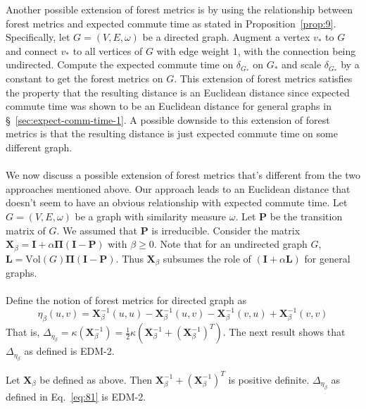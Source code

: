 Another possible extension of forest metrics is by using the
relationship between forest metrics and expected commute time as
stated in Proposition~\ref{prop:9}. Specifically, let $G =
(V,E,\omega)$ be a directed graph. Augment a vertex $v_{*}$ to $G$ and
connect $v_{*}$ to all vertices of $G$ with edge weight $1$, with the
connection being undirected. Compute the expected commute time on
$\delta_{G_{*}}$ on $G_*$ and scale $\delta_{G_{*}}$ by a constant to
get the forest metrics on $G$. This extension of forest metrics
satisfies the property that the resulting distance is an Euclidean
distance since expected commute time was shown to be an Euclidean
distance for general graphs in \S~\ref{sec:expect-comm-time-1}. A
possible downside to this extension of forest metrics is that the
resulting distance is just expected commute time on some
different graph. \\ \\
% 
% 
\noindent 
We now discuss a possible extension of forest metrics that's different
from the two approaches mentioned above. Our approach leads to an
Euclidean distance that doesn't seem to have an obvious relationship
with expected commute time. Let $G = (V,E,\omega)$ be a graph with
similarity measure $\omega$. Let $\mathbf{P}$ be the transition matrix
of $G$. We assumed that $\mathbf{P}$ is irreducible. Consider the
matrix $\mathbf{X}_{\beta} = \mathbf{I} + \alpha \bm{\Pi}(\mathbf{I} -
\mathbf{P})$ with $\beta \geq 0$. Note that for an undirected graph
$G$, $\mathbf{L} = \mathrm{Vol}(G) \bm{\Pi}(\mathbf{I} -
\mathbf{P})$. Thus $\mathbf{X}_{\beta}$ subsumes the role of
$(\mathbf{I} + \alpha \mathbf{L})$ for general graphs. \\ \\
% 
% 
Define the notion of forest metrics for directed graph as
\begin{equation}
  \label{eq:81}
  \eta_{\beta}(u,v) = \mathbf{X}_\beta^{-1}(u,u) - \mathbf{X}_\beta^{-1}(u,v) -
  \mathbf{X}_\beta^{-1}(v,u) + \mathbf{X}_\beta^{-1}(v,v) 
\end{equation}
That is, $\Delta_{\eta_{\beta}} = \kappa(\mathbf{X}_\beta^{-1}) =
\tfrac{1}{2}\kappa(\mathbf{X}_\beta^{-1} +
(\mathbf{X}_{\beta}^{-1})^{T})$. The next result shows that
$\Delta_{\eta_{\beta}}$ as defined is EDM-2.
\begin{proposition}
  \label{prop:23}
  Let $\mathbf{X}_{\beta}$ be defined as above. Then
  $\mathbf{X}_{\beta}^{-1} + (\mathbf{X}_{\beta}^{-1})^{T}$ is
  positive definite. $\Delta_{\eta_{\beta}}$ as defined in
  Eq.~\eqref{eq:81} is EDM-2.
\end{proposition}
